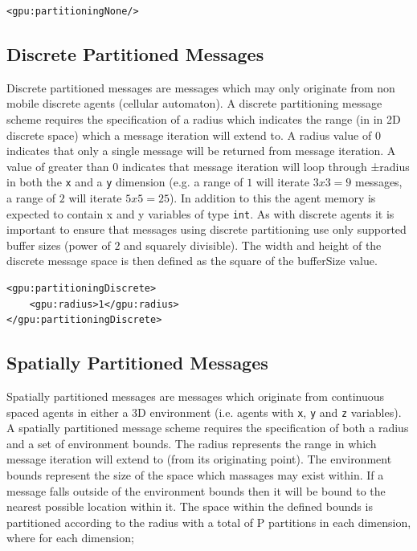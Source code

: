 \documentclass[11pt, a4paper, onecolumn, oneside]{report}
\begin{document}
\begin{verbatim}
<gpu:partitioningNone/>
\end{verbatim}

\subsection{Discrete Partitioned Messages}
\label{sec:243}

Discrete partitioned messages are messages which may only originate from non mobile discrete agents (cellular automaton).
A discrete partitioning message scheme requires the specification of a radius which indicates the range (in in 2D discrete space) which a message iteration will extend to.
A radius value of 0 indicates that only a single message will be returned from message iteration.
A value of greater than 0 indicates that message iteration will loop through ±radius in both the \texttt{x} and a \texttt{y} dimension (e.g.
a range of $1$ will iterate $3x3=9$ messages, a range of $2$ will iterate $5x5=25$).
In addition to this the agent memory is expected to contain x and y variables of type \texttt{int}.
As with discrete agents it is important to ensure that messages using discrete partitioning use only supported buffer sizes (power of $2$ and squarely divisible). The width and height of the discrete message space is then defined as the square of the bufferSize value.

\begin{verbatim}
<gpu:partitioningDiscrete>
    <gpu:radius>1</gpu:radius>
</gpu:partitioningDiscrete>
\end{verbatim}

\subsection{Spatially Partitioned Messages}
\label{sec:244}

Spatially partitioned messages are messages which originate from continuous spaced agents in either a 3D environment (i.e. agents with \texttt{x}, \texttt{y} and \texttt{z} variables).
A spatially partitioned message scheme requires the specification of both a radius and a set of environment bounds.
The radius represents the range in which message iteration will extend to (from its originating point).
The environment bounds represent the size of the space which massages may exist within.
If a message falls outside of the environment bounds then it will be bound to the nearest possible location within it.
The space within the defined bounds is partitioned according to the radius with a total of P partitions in each dimension, where for each dimension;
\end{document}
